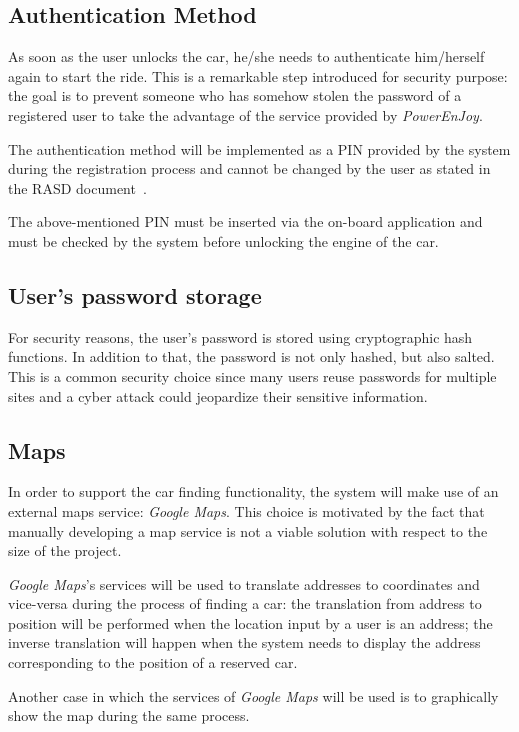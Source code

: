 \subsection{Authentication Method}
As soon as the user unlocks the car, he/she needs to authenticate him/herself again to start the ride. This is a remarkable step introduced for security purpose: the goal is to prevent someone who has somehow stolen the password of a registered user to take the advantage of the service provided by \emph{PowerEnJoy}.

The authentication method will be implemented as a PIN provided by the system during the registration process and cannot be changed by the user as stated in the RASD document~\cite{rasd}.

The above-mentioned PIN must be inserted via the on-board application and must be checked by the system before unlocking the engine of the car.

\subsection{User's password storage}
For security reasons, the user's password is stored using cryptographic hash functions. In addition to that, the password is not only hashed, but also salted. This is a common security choice since many users reuse passwords for multiple sites and a cyber attack could jeopardize their sensitive information.

\subsection{Maps}
In order to support the car finding functionality, the system will make use of an external maps service: \textit{Google Maps}. This choice is motivated by the fact that manually developing a map service is not a viable solution with respect to the size of the project.

\textit{Google Maps}'s services will be used to translate addresses to coordinates and vice-versa during the process of finding a car: the translation from address to position will be performed when the location input by a user is an address; the inverse translation will happen when the system needs to display the address corresponding to the position of a reserved car.

Another case in which the services of \textit{Google Maps} will be used is to graphically show the map during the same process.